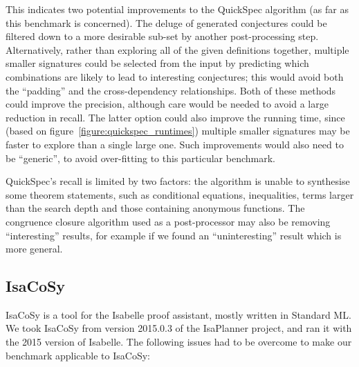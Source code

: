 This indicates two potential improvements to the QuickSpec algorithm (as far as
this benchmark is concerned). The deluge of generated conjectures could be
filtered down to a more desirable sub-set by another post-processing step.
Alternatively, rather than exploring all of the given definitions together,
multiple smaller signatures could be selected from the input by predicting which
combinations are likely to lead to interesting conjectures; this would avoid
both the ``padding'' and the cross-dependency relationships. Both of these
methods could improve the precision, although care would be needed to avoid a
large reduction in recall. The latter option could also improve the running
time, since (based on figure~\ref{figure:quickspec_runtimes}) multiple smaller
signatures may be faster to explore than a single large one. Such improvements
would also need to be ``generic'', to avoid over-fitting to this particular
benchmark.

QuickSpec's recall is limited by two factors: the algorithm is unable to
synthesise some theorem statements, such as conditional equations, inequalities,
terms larger than the search depth and those containing anonymous functions.
The congruence closure algorithm used as a post-processor may also be removing
``interesting'' results, for example if we found an ``uninteresting'' result
which is more general.

\subsection{IsaCoSy}

IsaCoSy is a tool for the Isabelle proof assistant, mostly written in Standard
ML. We took IsaCoSy from version 2015.0.3 of the IsaPlanner project, and ran it
with the 2015 version of Isabelle. The following issues had to be overcome to
make our benchmark applicable to IsaCoSy:

